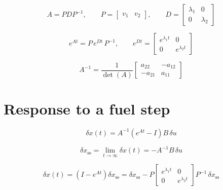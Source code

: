 \documentclass[11pt,a4paper]{article}
\begin{document}
\begin{equation}
  A = P D P^{-1}, \qquad
  P = \begin{bmatrix} v_1 & v_2 \end{bmatrix}, \qquad
  D = \begin{bmatrix} \lambda_1 & 0 \\ 0 & \lambda_2 \end{bmatrix}
  \label{eq:diagonalization}
\end{equation}

\begin{equation}
  e^{At} = P\, e^{Dt}\, P^{-1}, \qquad
  e^{Dt} = \begin{bmatrix} e^{\lambda_1 t} & 0 \\ 0 & e^{\lambda_2 t} \end{bmatrix}
  \label{eq:matrix-exponential}
\end{equation}

\begin{equation}
  A^{-1} = \frac{1}{\det(A)}
  \begin{bmatrix} a_{22} & -a_{12} \\ -a_{21} & a_{11} \end{bmatrix}
  \label{eq:inverse}
\end{equation}

\section{Response to a fuel step}

\begin{equation}
  \delta x(t) = A^{-1}\left(e^{At} - I\right) B\,\delta u
  \label{eq:step-response}
\end{equation}

\begin{equation}
  \delta x_{\mathrm{ss}} = \lim_{t\to\infty} \delta x(t) = -A^{-1} B\,\delta u
  \label{eq:steady-state}
\end{equation}

\begin{equation}
  \delta x(t) = \left(I - e^{At}\right)\delta x_{\mathrm{ss}}
  = \delta x_{\mathrm{ss}} - P \begin{bmatrix} e^{\lambda_1 t} & 0 \\ 0 & e^{\lambda_2 t} \end{bmatrix} P^{-1}\,\delta x_{\mathrm{ss}}
  \label{eq:step-modal}
\end{equation}
\end{document}
